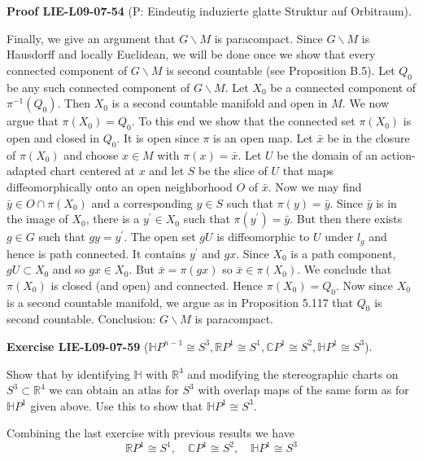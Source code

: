 \documentclass[10pt, letterpaper]{article}
\newcommand{\CustomHeading}[3]{%
  \par\medskip\noindent%
  \textbf{#1 #2} \textnormal{(#3)}.\enskip%
}
\newenvironment{EXE}[2]{\CustomHeading{Exercise}{#1}{#2}}{}
\newenvironment{PROOF}[2]{\CustomHeading{Proof}{#1}{#2}}{}
\begin{document}
\begin{PROOF}{LIE-L09-07-54}{P: Eindeutig induzierte glatte Struktur auf Orbitraum}
Finally, we give an argument that $G \backslash M$ is paracompact. Since $G \backslash M$ is Hausdorff and locally Euclidean, we will be done once we show that every connected component of $G \backslash M$ is second countable (see Proposition B.5). Let $Q_{0}$ be any such connected component of $G \backslash M$. Let $X_{0}$ be a connected component of $\pi^{-1}\left(Q_{0}\right)$. Then $X_{0}$ is a second countable manifold and open in $M$. We now argue that $\pi\left(X_{0}\right)=Q_{0}$. To this end we show that the connected set $\pi\left(X_{0}\right)$ is open and closed in $Q_{0}$. It is open since $\pi$ is an open map. Let $\bar{x}$ be in the closure of $\pi\left(X_{0}\right)$ and choose $x \in M$ with $\pi(x)=\bar{x}$. Let $U$ be the domain of an action-adapted chart centered at $x$ and let $S$ be the slice of $U$ that maps diffeomorphically onto an open neighborhood $O$ of $\bar{x}$. Now we may find $\bar{y} \in O \cap \pi\left(X_{0}\right)$ and a corresponding $y \in S$ such that $\pi(y)=\bar{y}$. Since $\bar{y}$ is in the image of $X_{0}$, there is a $y^{\prime} \in X_{0}$ such that $\pi\left(y^{\prime}\right)=\bar{y}$. But then there exists $g \in G$ such that $g y=y^{\prime}$. The open set $g U$ is diffeomorphic to $U$ under $l_{g}$ and hence is path connected. It contains $y^{\prime}$ and $g x$. Since $X_{0}$ is a path component, $g U \subset X_{0}$ and so $g x \in X_{0}$. But $\bar{x}=\pi(g x)$ so $\bar{x} \in \pi\left(X_{0}\right)$. We conclude that $\pi\left(X_{0}\right)$ is closed (and open) and connected. Hence $\pi\left(X_{0}\right)=Q_{0}$. Now since $X_{0}$ is a second countable manifold, we argue as in Proposition 5.117 that $Q_{0}$ is second countable. Conclusion: $G \backslash M$ is paracompact.
\end{PROOF}

\begin{EXE}{LIE-L09-07-59}{$\mathbb{H}P^{n-1}\cong S^3, \mathbb{R} P^{1} \cong S^{1}, \mathbb{C} P^{1} \cong S^{2}, \mathbb{H} P^{1} \cong S^{3}$}
Show that by identifying $\mathbb{H}$ with $\mathbb{R}^{4}$ and modifying the stereographic charts on $S^{3} \subset \mathbb{R}^{4}$ we can obtain an atlas for $S^{3}$ with overlap maps of the same form as for $\mathbb{H} P^{1}$ given above. Use this to show that $\mathbb{H} P^{1} \cong S^{3}$.

Combining the last exercise with previous results we have
$$
\mathbb{R} P^{1} \cong S^{1}, \quad \mathbb{C} P^{1} \cong S^{2}, \quad \mathbb{H} P^{1} \cong S^{3}
$$
\end{EXE}
\end{document}
